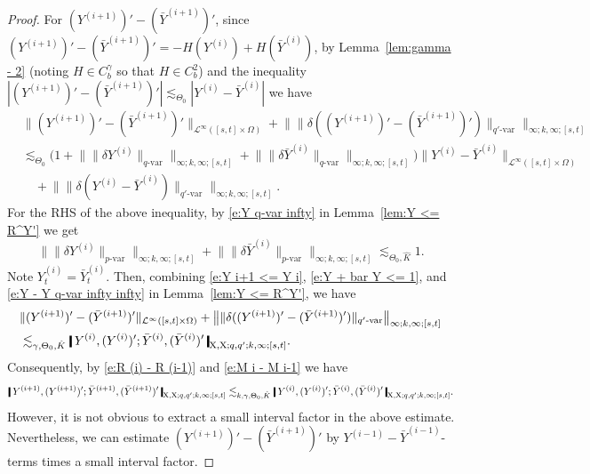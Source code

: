 \documentclass[11pt,reqno]{amsart}
\numberwithin{equation}{section}
\newcommand{\shortthickbar}{%
  \vcenter{\hbox{\rule{1.8pt}{2.2ex}}}%
}
\newcommand{\thicknm}[1]{%
  \mathopen{\shortthickbar}%
  \mkern4mu #1 \mkern4mu%
  \mathclose{\shortthickbar}%
}
\begin{document}
\begin{proof}
For $(Y^{(i+1)})' - (\bar Y^{(i+1)})'$, since $(Y^{(i+1)})' - (\bar Y^{(i+1)})' = - H(Y^{(i)}) + H(\bar Y^{(i)})$, by Lemma~\ref{lem:gamma - 2} (noting $H \in C^{\gamma}_b$ so that $H \in C^{2}_b$) and the inequality $|(Y^{(i+1)})' - (\bar Y^{(i+1)})'|\lesssim_{\Theta_0} |Y^{(i)} - \bar Y^{(i)}|$ we have 
\begin{equation}\label{e:Y i+1 <= Y i}
\begin{aligned}
&\|(Y^{(i+1)})' - (\bar Y^{(i+1)})'\|_{\mathcal L^{\infty}([s,t] \times \Omega)} + \big\| \|\delta ( (Y^{(i+1)})' - (\bar Y^{(i+1)})' )\|_{q'\text{-}\mathrm{var}} \big\|_{\infty;k,\infty;[s,t]} \\
&\lesssim_{\Theta_0} \Big(1 + \big\| \|\delta Y^{(i)}\|_{q\text{-}\mathrm{var}} \big\|_{\infty;k,\infty;[s,t]} + \big\| \|\delta \bar Y^{(i)}\|_{q\text{-}\mathrm{var}} \big\|_{\infty;k,\infty;[s,t]} \Big) \|Y^{(i)} - \bar Y^{(i)}\|_{\mathcal L^{\infty}([s,t] \times \Omega)} \\
&\quad + \big\| \|\delta (Y^{(i)} - \bar Y^{(i)})\|_{q'\text{-}\mathrm{var}} \big\|_{\infty;k,\infty;[s,t]}.
\end{aligned}
\end{equation}
For the RHS of the above inequality, by \eqref{e:Y q-var infty} in Lemma~\ref{lem:Y <= R^Y'} we get 
\begin{equation}\label{e:Y + bar Y <= 1}
\big\| \|\delta Y^{(i)}\|_{p\text{-}\mathrm{var}} \big\|_{\infty;k,\infty;[s,t]} + \big\| \|\delta \bar Y^{(i)}\|_{p\text{-}\mathrm{var}} \big\|_{\infty;k,\infty;[s,t]} \lesssim_{\Theta_0,\hat K} 1. 
\end{equation}
Note $Y^{(i)}_t = \bar Y^{(i)}_t$. Then, combining \eqref{e:Y i+1 <= Y i}, \eqref{e:Y + bar Y <= 1}, and \eqref{e:Y - Y q-var infty infty} in Lemma~\ref{lem:Y <= R^Y'}, we have 
\begin{equation*}
\begin{aligned}
&\|(Y^{(i+1)})' - (\bar Y^{(i+1)})'\|_{\mathcal L^{\infty}([s,t]\times\Omega)} + \big\| \|\delta ( (Y^{(i+1)})' - (\bar Y^{(i+1)})' )\|_{q'\text{-}\mathrm{var}} \big\|_{\infty;k,\infty;[s,t]} \\
&\lesssim_{\gamma,\Theta_0,\hat K} \thicknm{Y^{(i)},(Y^{(i)})'; \bar Y^{(i)},(\bar Y^{(i)})'}_{\mathrm X,\mathrm X;q,q';k,\infty;[s,t]}.
\end{aligned}
\end{equation*}
Consequently, by \eqref{e:R (i) - R (i-1)} and \eqref{e:M i - M i-1} we have 
\begin{equation}\label{e:(2) < = (1)}
\thicknm{Y^{(i+1)},(Y^{(i+1)})'; \bar Y^{(i+1)},(\bar Y^{(i+1)})'}_{\mathrm X,\mathrm X;q,q';k,\infty;[s,t]} \lesssim_{k,\gamma,\Theta_0,\hat K} \thicknm{Y^{(i)},(Y^{(i)})'; \bar Y^{(i)},(\bar Y^{(i)})'}_{\mathrm X,\mathrm X;q,q';k,\infty;[s,t]}. 
\end{equation}
However, it is not obvious to extract a small interval factor in the above estimate. Nevertheless, we can estimate $(Y^{(i+1)})' - (\bar Y^{(i+1)})'$ by $Y^{(i-1)} - \bar Y^{(i-1)}$-terms times a small interval factor. 


\end{proof}
\end{document}
